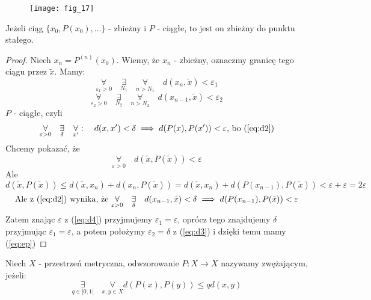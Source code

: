 \documentclass[../main.tex]{subfiles}
\begin{document}
\begin{figure}[h]
    \centering
    \texttt{[image: fig\_17]}
\end{figure}

\begin{tw}
Jeżeli ciąg $\{x_0, P(x_0), \dots \} $ - zbieżny i $P$ - ciągłe, to jest on zbieżny do punktu stałego.
\end{tw}

\begin{proof}

Niech $x_n = P^{(n)} (x_0)$. Wiemy, że $x_n$ - zbieżny, oznaczmy granicę tego ciągu przez $\tilde x$.
Mamy:
\begin{equation}\label{eq:d2}
    \underset{\varepsilon_1 > 0}{\forall}\quad \underset{N_1}{\exists}\quad \underset{n>N_1}{\forall}\quad d(x_n,\tilde x) < \varepsilon_1
\end{equation}
\begin{equation}\label{eq:d3}
    \underset{\varepsilon_2>0}{\forall}\quad \underset{N_2}{\exists}\quad \underset{n>N_2}{\forall}\quad d(x_{n-1},\tilde x) < \varepsilon_2
\end{equation}
$P$ - ciągłe, czyli
    \[
        \underset{\varepsilon>0}{\forall}\quad \underset{\delta}{\exists}\quad \underset{x'}{\forall}:\quad d(x,x')<\delta \implies d(P(x),P(x'))<\varepsilon \text{, bo (\ref{eq:d2})}
    \]
Chcemy pokazać, że
\begin{equation}\label{eq:d4}
    \underset{\varepsilon>0}{\forall}\quad d(\tilde x,P(\tilde x))<\varepsilon
\end{equation}
Ale
\begin{equation}\label{eq:ep}
    d(\tilde x, P(\tilde x)) \leq d(\tilde x,x_n) + d(x_n, P(\tilde x)) = d(\tilde x, x_n) + d(P(x_{n-1}),P(\tilde x)) < \varepsilon + \varepsilon = 2 \varepsilon
\end{equation}
\begin{equation}
    \text{Ale z (\ref{eq:d2}) wynika, że }
    \underset{\varepsilon>0}{\forall}\quad \underset{\delta}{\exists}\quad d(x_{n-1},\tilde x) < \delta \implies d(P(x_{n-1}),P(\tilde x)) < \varepsilon
\end{equation}
Zatem znając $\varepsilon$ z (\ref{eq:d4}) przyjmujemy $\varepsilon_1 = \varepsilon$, oprócz tego znajdujemy $\delta$ przyjmując $\varepsilon_1 = \varepsilon$, a potem położymy $\varepsilon_2 = \delta$ z (\ref{eq:d3}) i dzięki temu mamy (\ref{eq:ep})
\end{proof}


\begin{definicja}
    Niech $X$ - przestrzeń metryczna, odwzorowanie $P: X\to X$ nazywamy zwężającym, jeżeli:
    \begin{equation}\label{eq:zwezajace}
        \underset{q\in [0,1[}{\exists}\quad \underset{x,y\in X}{\forall} d(P(x),P(y)) \leq q d(x,y)
    \end{equation}
\end{definicja}
\end{document}
